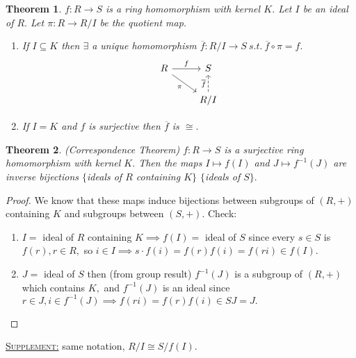 \documentclass{article}
\newcommand{\st}{\ s.t.\ }
\newcommand{\fancyem}[1]{\underline{\textsc{#1}}}
\newtheorem{theorem}{Theorem}[section]
\theoremstyle{definition}
\theoremstyle{remark}
\begin{document}
\begin{theorem}
$f: R \to S$ is a ring homomorphism with kernel $K$. Let $I$ be an ideal of $R.$ Let $\pi: R \to R/I$ be the quotient map.
\begin{enumerate}
\item
	If $I \subseteq K$ then $\exists$ a unique homomorphism $\overline{f}: R/I \to S \st \overline{f} \circ \pi = f.$
	\[\begin{tikzcd}
	R \arrow[r, "f"] & S  \\
	& R/I \arrow[ul, leftarrow, "\pi"] \arrow[u, dashrightarrow, "\overline{f}"]
	\end{tikzcd}\]
\item
	If $I = K$ and $f$ is surjective then $\overline{f}$ is $\cong.$
\end{enumerate}
\end{theorem}

\begin{theorem}(Correspondence Theorem)
$f: R \to S$ is a surjective ring homomorphism with kernel $K.$ Then the maps
$I \mapsto f(I)$ and $J \mapsto f^{-1}(J)$ are inverse bijections
$\{$ideals of $R$ containing $K\}$ $\{$ideals of $S\}.$ 
\end{theorem}
\begin{proof}
We know that these maps induce bijections between subgroups of $(R, +)$ containing $K$ and subgroups between $(S, +).$
Check:
\begin{enumerate}
\item
$I =$ ideal of $R$ containing $K \implies f(I) =$ ideal of $S$ since every $s \in S$ is $f(r), r \in R,$ so $i \in I \implies s \cdot f(i) = f(r)f(i) = f(ri) \in f(I).$
\item
$J =$ ideal of $S$ then (from group result) $f^{-1}(J)$ is a subgroup of $(R, +)$ which contains $K,$ and $f^{-1}(J)$ is an ideal since $r \in J, i \in f^{-1}(J) \implies f(ri) = f(r)f(i) \in SJ = J.$ \qedhere
\end{enumerate}
\end{proof}

\fancyem{Supplement:} same notation, $R/I \cong S/f(I).$
\end{document}
